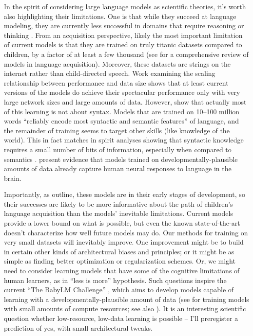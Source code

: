 \documentclass[output=paper,colorlinks,citecolor=brown]{langscibook}
\begin{document}
In the spirit of considering large language models as scientific theories, it's worth also highlighting their limitations. One is that while they succeed at language modeling, they are currently less successful in domains that require reasoning or thinking \citep{mahowald2023dissociating,lake2021word,barrett2018measuring,collins2022structured}. From an acquisition perspective, likely the most important limitation of current models is that they are trained on truly titanic datasets compared to children, by a factor of at least a few thousand (see \citealt{warstadt2022artificial} for a comprehensive review of models in language acquisition). Moreover, these datasets are strings on the internet rather than child-directed speech. Work examining the scaling relationship between performance and data size shows that at least current versions of the models do achieve their spectacular performance only with very large network sizes and large amounts of data. \citep{kaplan2020scaling} However, \citet{zhang2020you} show that actually most of this learning is not about syntax. Models that are trained on 10--100 million words ``reliably encode most syntactic and semantic features'' of language, and the remainder of training seems to target other skills (like knowledge of the world). This in fact matches in spirit analyses showing that syntactic knowledge requires a small number of bits of information, especially when compared to semantics \citep{mollica2019humans}. \citet{hosseini2022artificial} present evidence that models trained on developmentally-plausible amounts of data already capture human neural responses to language in the brain. 

Importantly, as \citet{warstadt2022artificial} outline, these models are in their early stages of development, so their successes are likely to be more informative about the path of children's language acquisition than the models' inevitable limitations. Current models provide a lower bound on what is possible, but even the known state-of-the-art doesn't characterize how well future models may do. Our methods for training on very small datasets will inevitably improve. One improvement might be to build in certain other kinds of architectural biases and principles; or it might be as simple as finding better optimization or regularization schemes. Or, we might need to consider learning models that have some of the cognitive limitations of human learners, as in  ``less is more'' hypothesis. Such questions inspire the current ``The BabyLM Challenge'' \citep{warstadt2023call}, which aims to develop models capable of learning with a developmentally-plausible amount of data (see \citealt{geiping2022cramming} for training models with small amounts of compute resources; see also \citealt{eldan2023tinystories}). It is an interesting scientific question whether low-resource, low-data learning is possible -- I'll preregister a prediction of yes, with small architectural tweaks.
\end{document}
